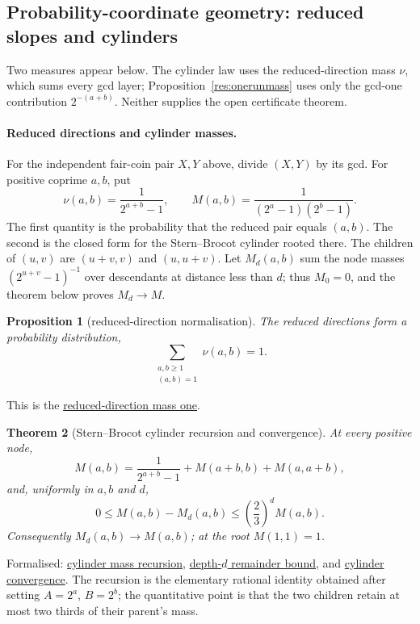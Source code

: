 \documentclass[11pt]{article}
\newcommand{\commit}{bb4e24651b37cd096d3749ef299c3317930b3a3b}
\newcommand{\repobase}{https://github.com/wcook04/plectis-lean-erdos249-257/blob/\commit}
\newcommand{\PK}{Erdos249257}
\newcommand{\lword}[4]{\href{\repobase/\PK/#1\#L#2}{#4}}
\newtheorem{theorem}{Theorem}[section]
\newtheorem{proposition}[theorem]{Proposition}
\theoremstyle{definition}
\theoremstyle{remark}
\begin{document}
{\subsection{Probability-coordinate geometry: reduced slopes and cylinders}
\label{app:lambert-probability}

Two measures appear below.  The cylinder law uses the reduced-direction mass
$\nu$, which sums every gcd layer; Proposition~\ref{res:onerunmass} uses only
the gcd-one contribution $2^{-(a+b)}$.  Neither supplies the open certificate
theorem.

\paragraph{Reduced directions and cylinder masses.}
For the independent fair-coin pair $X,Y$ above, divide $(X,Y)$ by its gcd.
For positive coprime \(a,b\), put
\[
  \nu(a,b)=\frac1{2^{a+b}-1},
  \qquad
  M(a,b)=\frac1{(2^a-1)(2^b-1)}.
\]
The first quantity is the probability that the reduced pair equals $(a,b)$.
The second is the closed form for the Stern--Brocot cylinder rooted there.
The children of $(u,v)$ are $(u+v,v)$ and $(u,u+v)$.  Let $M_d(a,b)$ sum the
node masses $(2^{u+v}-1)^{-1}$ over descendants at distance less than $d$;
thus $M_0=0$, and the theorem below proves $M_d\to M$.

\begin{proposition}[reduced-direction normalisation]\label{res:directionnormalization}
The reduced directions form a probability distribution,
\[
  \sum_{\substack{a,b\ge1\\(a,b)=1}}\nu(a,b)=1.
\]
\end{proposition}
\noindent This is the
\lword{GcdMomentCalculus.lean}{349}{tsum_pos_coprime_inv_mersenne_eq_one}{reduced-direction mass one}.

\begin{theorem}[Stern--Brocot cylinder recursion and convergence]
\label{res:sternbrocotcylinders}
At every positive node,
\[
  M(a,b)=\frac1{2^{a+b}-1}+M(a+b,b)+M(a,a+b),
\]
and, uniformly in \(a,b\) and \(d\),
\[
  0\le M(a,b)-M_d(a,b)
  \le \left(\frac23\right)^d M(a,b).
\]
Consequently \(M_d(a,b)\to M(a,b)\); at the root \(M(1,1)=1\).
\end{theorem}
\noindent Formalised:
\lword{GcdMomentCalculus.lean}{474}{cylinderMass_split}{cylinder mass recursion},
\lword{GcdMomentCalculus.lean}{525}{sternBrocotDepthMass_error}{depth-$d$ remainder bound}, and
\lword{GcdMomentCalculus.lean}{560}{tendsto_sternBrocotDepthMass}{cylinder convergence}.
The recursion is the elementary rational identity obtained after setting
\(A=2^a\), \(B=2^b\); the quantitative point is that the two children retain
at most two thirds of their parent's mass.

}
\end{document}
